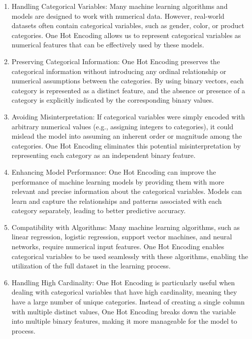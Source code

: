 \begin{enumerate}
	\item Handling Categorical Variables: Many machine learning algorithms and models are designed to work with numerical data. However, real-world datasets often contain categorical variables, such as gender, color, or product categories. One Hot Encoding allows us to represent categorical variables as numerical features that can be effectively used by these models.
	
	\item Preserving Categorical Information: One Hot Encoding preserves the categorical information without introducing any ordinal relationship or numerical assumptions between the categories. By using binary vectors, each category is represented as a distinct feature, and the absence or presence of a category is explicitly indicated by the corresponding binary values.
	
	\item Avoiding Misinterpretation: If categorical variables were simply encoded with arbitrary numerical values (e.g., assigning integers to categories), it could mislead the model into assuming an inherent order or magnitude among the categories. One Hot Encoding eliminates this potential misinterpretation by representing each category as an independent binary feature.
	
	\item Enhancing Model Performance: One Hot Encoding can improve the performance of machine learning models by providing them with more relevant and precise information about the categorical variables. Models can learn and capture the relationships and patterns associated with each category separately, leading to better predictive accuracy.
	
	\item Compatibility with Algorithms: Many machine learning algorithms, such as linear regression, logistic regression, support vector machines, and neural networks, require numerical input features. One Hot Encoding enables categorical variables to be used seamlessly with these algorithms, enabling the utilization of the full dataset in the learning process.
	
	\item Handling High Cardinality: One Hot Encoding is particularly useful when dealing with categorical variables that have high cardinality, meaning they have a large number of unique categories. Instead of creating a single column with multiple distinct values, One Hot Encoding breaks down the variable into multiple binary features, making it more manageable for the model to process.
	
\end{enumerate}

